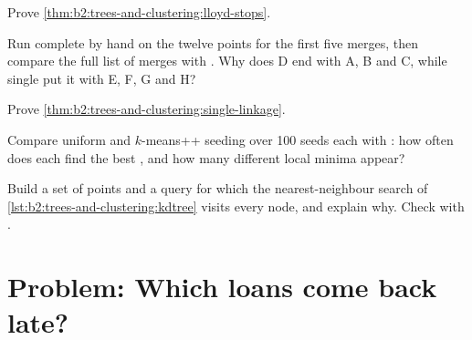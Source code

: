 \begin{exercise}[$\star\star$]\label{exo:b2:trees-and-clustering:8}
Prove \cref{thm:b2:trees-and-clustering:lloyd-stops}.
\end{exercise}

\begin{exercise}[$\star\star$]\label{exo:b2:trees-and-clustering:9}
Run complete  by hand on the twelve points for the first five merges, then compare the full list of merges with
. Why does D end with A, B and C, while single  put it with E, F, G and H?
\end{exercise}

\begin{exercise}[$\star\star\star$]\label{exo:b2:trees-and-clustering:10}
Prove \cref{thm:b2:trees-and-clustering:single-linkage}.
\end{exercise}

\begin{exercise}[$\star\star\star$]\label{exo:b2:trees-and-clustering:11}
Compare uniform and $k$-means++ seeding over 100 seeds each with : how often does each find the
best , and how many different local minima appear?
\end{exercise}

\begin{exercise}[$\star\star\star$]\label{exo:b2:trees-and-clustering:12}
Build a set of points and a query for which the nearest-neighbour search of \cref{lst:b2:trees-and-clustering:kdtree}
visits every node, and explain why. Check with .
\end{exercise}

\section{Problem: Which loans come back late?}\label{sec:b2:trees-and-clustering:problem}

